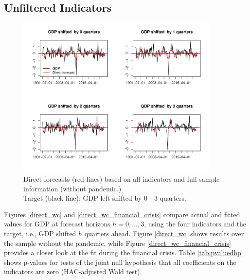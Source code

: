 \documentclass[11pt,a4paper]{article}
\begin{document}
\subsection{Unfiltered Indicators}\label{cdf}


\begin{figure}[H]
    \begin{center}
        \includegraphics[width=0.9\textwidth]{./Figures/direct_wc_all.pdf}
        \caption{Direct forecasts (red lines) based on all indicators and full sample information (without pandemic.)\\
        Target (black line): GDP left-shifted  by 0 - 3 quarters.
        \label{direct_wc}}
    \end{center}
\end{figure}

Figures \eqref{direct_wc} and \eqref{direct_wc_financial_crisis} compare actual and fitted values for GDP at forecast horizons $h = 0, \ldots, 3$, using the four indicators and the target, i.e., GDP shifted $h$ quarters ahead. Figure \eqref{direct_wc} shows results over the sample without the pandemic, while Figure \eqref{direct_wc_financial_crisis} provides a closer look at the fit during the financial crisis. Table \eqref{tab:pvaluedhp} shows p-values for tests of the joint null hypothesis that all coefficients on the indicators are zero (HAC-adjusted Wald test).
\end{document}
